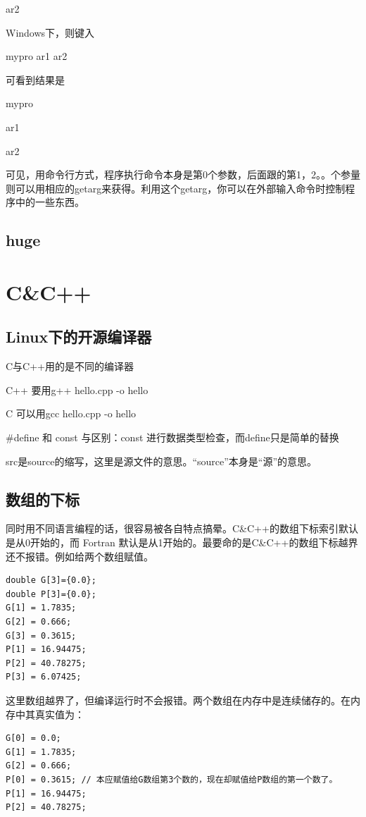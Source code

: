 ar2

Windows下，则键入

mypro ar1 ar2

可看到结果是

mypro

ar1

ar2

可见，用命令行方式，程序执行命令本身是第0个参数，后面跟的第1，2。。个参量则可以用相应的getarg来获得。利用这个getarg，你可以在外部输入命令时控制程序中的一些东西。



\section{huge}













\chapter{C\&C++}
\section{Linux下的开源编译器}
C与C++用的是不同的编译器

C++ 要用g++ hello.cpp -o hello

C  可以用gcc hello.cpp -o hello

\#define 和 const 与区别：const 进行数据类型检查，而define只是简单的替换

src是source的缩写，这里是源文件的意思。“source”本身是“源”的意思。


\section{数组的下标}
同时用不同语言编程的话，很容易被各自特点搞晕。C\&C++的数组下标索引默认是从0开始的，而 Fortran 默认是从1开始的。最要命的是C\&C++的数组下标越界还不报错。例如给两个数组赋值。
\begin{verbatim}
double G[3]={0.0};
double P[3]={0.0};
G[1] = 1.7835;
G[2] = 0.666;
G[3] = 0.3615;
P[1] = 16.94475;
P[2] = 40.78275;
P[3] = 6.07425;
\end{verbatim}
这里数组越界了，但编译运行时不会报错。两个数组在内存中是连续储存的。在内存中其真实值为：
\begin{verbatim}
G[0] = 0.0;
G[1] = 1.7835;
G[2] = 0.666; 
P[0] = 0.3615; // 本应赋值给G数组第3个数的，现在却赋值给P数组的第一个数了。
P[1] = 16.94475;
P[2] = 40.78275;
\end{verbatim}


